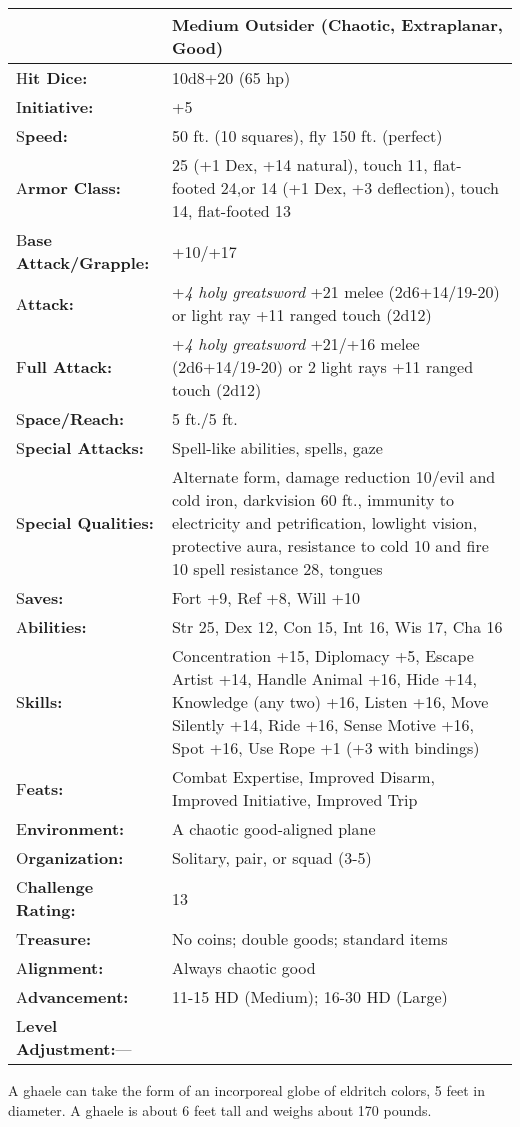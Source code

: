\documentclass{article}
\begin{document}
\begin{tabular}{|>{\raggedright}p{91pt}|>{\raggedright}p{226pt}|}
\hline
  & Medium Outsider (Chaotic, Extraplanar, Good)\tabularnewline
\hline
H\textbf{it Dice:} & 10d8+20 (65 hp)\tabularnewline
\hline
I\textbf{nitiative:} & +5\tabularnewline
\hline
S\textbf{peed:} & 50 ft. (10 squares), fly 150 ft. (perfect)\tabularnewline
\hline
A\textbf{rmor Class:} & 25 (+1 Dex, +14 natural), touch 11, flat-footed 24,or\linebreak{}
14 (+1 Dex, +3 deflection), touch 14, flat-footed 13\tabularnewline
\hline
B\textbf{ase Attack/Grapple:} & +10/+17\tabularnewline
\hline
A\textbf{ttack:} & +\textit{4 holy greatsword }+21 melee (2d6+14/19-20) or light 
ray +11 ranged touch (2d12)\tabularnewline
\hline
F\textbf{ull Attack:} & +\textit{4 holy greatsword }+21/+16 melee (2d6+14/19-20) 
or 2 light rays +11 ranged touch (2d12)\tabularnewline
\hline
S\textbf{pace/Reach:} & 5 ft./5 ft.\tabularnewline
\hline
S\textbf{pecial Attacks:} & Spell-like abilities, spells, gaze\tabularnewline
\hline
S\textbf{pecial Qualities:} & Alternate form, damage reduction 10/evil and cold 
iron, darkvision 60 ft., immunity to electricity and petrification, lowlight vision, 
protective aura, resistance to cold 10 and fire 10 spell resistance 28, tongues\tabularnewline
\hline
S\textbf{aves:} & Fort +9, Ref +8, Will +10\tabularnewline
\hline
A\textbf{bilities:} & Str 25, Dex 12, Con 15, Int 16, Wis 17, Cha 16\tabularnewline
\hline
S\textbf{kills:} & Concentration +15, Diplomacy +5, Escape Artist +14, Handle Animal 
+16, Hide +14, Knowledge (any two) +16, Listen +16, Move Silently +14, Ride +16, 
Sense Motive +16, Spot +16, Use Rope +1 (+3 with bindings)\tabularnewline
\hline
F\textbf{eats:} & Combat Expertise, Improved Disarm, Improved Initiative, Improved 
Trip\tabularnewline
\hline
E\textbf{nvironment:} & A chaotic good-aligned plane\tabularnewline
\hline
O\textbf{rganization:} & Solitary, pair, or squad (3-5)\tabularnewline
\hline
C\textbf{hallenge Rating:} & 13\tabularnewline
\hline
T\textbf{reasure:} & No coins; double goods; standard items\tabularnewline
\hline
A\textbf{lignment:} & Always chaotic good\tabularnewline
\hline
A\textbf{dvancement:} & 11-15 HD (Medium); 16-30 HD (Large)\tabularnewline
\hline
L\textbf{evel Adjustment:}--- & \tabularnewline
\hline
\end{tabular}

A ghaele can take the form of an incorporeal globe of eldritch colors, 5 feet in 
diameter. A ghaele is about 6 feet tall and weighs about 170 pounds.
\end{document}
